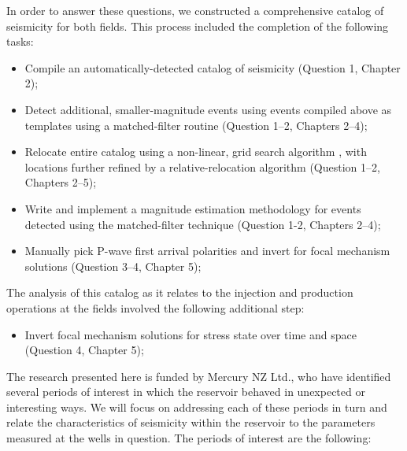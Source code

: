 In order to answer these questions, we constructed a comprehensive catalog of seismicity for both fields. This process included the completion of the following tasks:
\begin{itemize}
  \item{Compile an automatically-detected catalog of seismicity (Question 1, Chapter 2);}
  \item{Detect additional, smaller-magnitude events using events compiled above as templates using a matched-filter routine \citep{Chamberlain_2017} (Question 1--2, Chapters 2--4);}
  \item{Relocate entire catalog using a non-linear, grid search algorithm \citep{Lomax_2014}, with locations further refined by a relative-relocation algorithm \citep{Trugman_2017} (Question 1--2, Chapters 2--5);}
  \item{Write and implement a magnitude estimation methodology \citep{Shelly_2016} for events detected using the matched-filter technique (Question 1-2, Chapters 2--4);}
  \item{Manually pick P-wave first arrival polarities and invert for focal mechanism solutions \cite{Walsh_2009} (Question 3--4, Chapter 5);}
\end{itemize}

The analysis of this catalog as it relates to the injection and production operations at the fields involved the following additional step:
\begin{itemize}
  \item{Invert focal mechanism solutions for stress state over time and space \citep{Arnold_2007,Lund_2007} (Question 4, Chapter 5);}
\end{itemize}

The research presented here is funded by Mercury NZ Ltd., who have identified several periods of interest in which the reservoir behaved in unexpected or interesting ways. We will focus on addressing each of these periods in turn and relate the characteristics of seismicity within the reservoir to the parameters measured at the wells in question. The periods of interest are the following:

